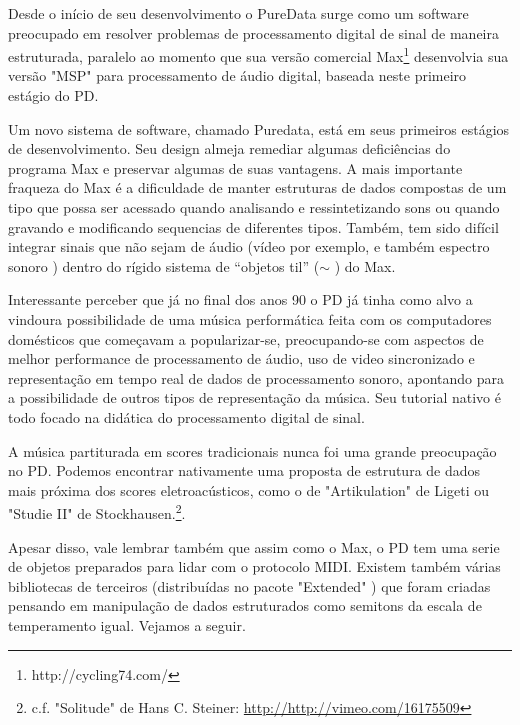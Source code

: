 \documentclass[
	12pt,				%
	openright,			%
	twoside,			%
	a4paper,			%
	english,			%
	french,				%
	spanish,			%
	brazil				%
	]{abntex2}
\begin{document}
Desde o início de seu desenvolvimento o PureData surge como um software preocupado em resolver problemas de processamento digital de sinal de maneira estruturada, paralelo ao momento que sua versão comercial Max\footnote{http://cycling74.com/} desenvolvia sua versão "MSP" para processamento de áudio digital, baseada neste primeiro estágio do PD. 

\begin{citacao}
Um novo sistema de software, chamado Puredata, está em seus primeiros estágios de desenvolvimento. Seu design almeja remediar algumas deficiências do programa Max e preservar algumas de suas vantagens. A mais importante fraqueza do Max é a dificuldade de manter estruturas de dados compostas de um tipo que possa ser acessado quando analisando e ressintetizando sons  ou quando gravando e modificando sequencias de diferentes tipos. Também, tem sido difícil integrar sinais que não sejam de áudio (vídeo por exemplo, e também espectro sonoro ) dentro do rígido sistema de “objetos til” ($\sim$ ) do Max.\cite{puckette1996pure}
\end{citacao}
 

Interessante perceber que já no final dos anos 90 o PD já tinha como alvo a vindoura possibilidade de uma música performática feita com os computadores domésticos que começavam a popularizar-se, preocupando-se com aspectos de melhor performance de processamento de áudio, uso de video sincronizado e representação em tempo real de dados de processamento sonoro, apontando para a possibilidade de outros tipos de representação da música. Seu tutorial nativo é todo focado na didática do processamento digital de sinal.\cite{puckette2007theory}  


A música partiturada em scores tradicionais nunca foi uma grande preocupação no PD. Podemos encontrar nativamente uma proposta de estrutura de dados mais próxima dos scores eletroacústicos, como o de "Artikulation" de Ligeti ou "Studie II" de Stockhausen.\footnote{ c.f. "Solitude" de Hans C. Steiner:  \url{http://http://vimeo.com/16175509}}.


Apesar disso, vale lembrar também que assim como o Max, o PD tem uma serie de objetos preparados para lidar com o protocolo MIDI. Existem também várias bibliotecas de terceiros (distribuídas no pacote "Extended" ) que foram criadas pensando em manipulação de dados estruturados como semitons da escala de temperamento igual. Vejamos a seguir.
\end{document}

